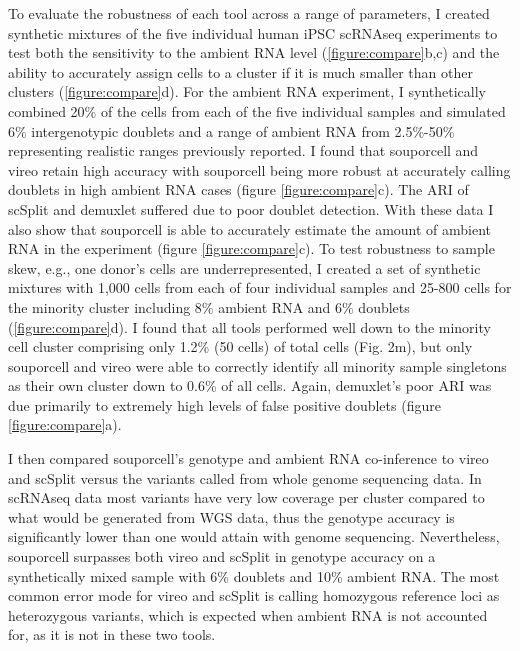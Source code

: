 \par{
To evaluate the robustness of each tool across a range of parameters, I created synthetic mixtures of the five individual human iPSC scRNAseq experiments to test both the sensitivity to the ambient RNA level (\ref{figure:compare}b,c) and the ability to accurately assign cells to a cluster if it is much smaller than other clusters (\ref{figure:compare}d). For the ambient RNA experiment, I synthetically combined 20\% of the cells from each of the five individual samples and simulated 6\% intergenotypic doublets and a range of ambient RNA from 2.5\%-50\% representing realistic ranges previously reported\cite{soupx}. I found that souporcell and vireo retain high accuracy with souporcell being more robust at accurately calling doublets in high ambient RNA cases (figure \ref{figure:compare}c). The ARI of scSplit and demuxlet suffered due to poor doublet detection. With these data I also show that souporcell is able to accurately estimate the amount of ambient RNA in the experiment (figure \ref{figure:compare}c). To test robustness to sample skew, e.g., one donor's cells are underrepresented, I created a set of synthetic mixtures with 1,000 cells from each of four individual samples and 25-800 cells for the minority cluster including 8\% ambient RNA and 6\% doublets (\ref{figure:compare}d). I found that all tools performed well down to the minority cell cluster comprising only 1.2\% (50 cells) of total cells (Fig. 2m), but only souporcell and vireo were able to correctly identify all minority sample singletons as their own cluster down to 0.6\% of all cells. Again, demuxlet's poor ARI was due primarily to extremely high levels of false positive doublets (figure \ref{figure:compare}a).
}




\par{
I then compared souporcell's genotype and ambient RNA co-inference to vireo and scSplit versus the variants called from whole genome sequencing data. In scRNAseq data most variants have very low coverage per cluster compared to what would be generated from WGS data, thus the genotype accuracy is significantly lower than one would attain with genome sequencing. Nevertheless, souporcell surpasses both vireo and scSplit in genotype accuracy on a synthetically mixed sample with 6\% doublets and 10\% ambient RNA. The most common error mode for vireo and scSplit is calling homozygous reference loci as heterozygous variants, which is expected when ambient RNA is not accounted for, as it is not in these two tools.
}

